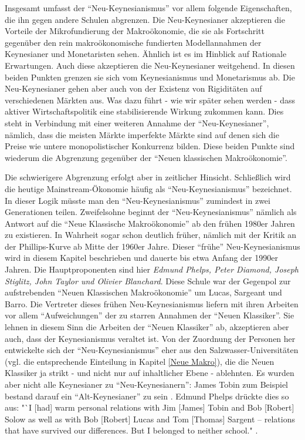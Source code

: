 Insgesamt umfasst der "`Neu-Keynesianismus"' vor allem folgende Eigenschaften, die ihn gegen andere Schulen abgrenzen. Die Neu-Keynesianer akzeptieren die Vorteile der Mikrofundierung der Makroökonomie, die sie als Fortschritt gegenüber den rein makroökonomische fundierten Modellannahmen der Keynesianer und Monetaristen sehen. Ähnlich ist es im Hinblick auf Rationale Erwartungen. Auch diese akzeptieren die Neu-Keynesianer weitgehend. In diesen beiden Punkten grenzen sie sich vom Keynesianismus und Monetarismus ab. Die Neu-Keynesianer gehen aber auch von der Existenz von Rigiditäten auf verschiedenen Märkten aus. Was dazu führt - wie wir später sehen werden - dass aktiver Wirtschaftspolitik eine stabilisierende Wirkung zukommen kann. Dies steht in Verbindung mit einer weiteren Annahme der "`Neu-Keynesianer"', nämlich, dass die meisten Märkte imperfekte Märkte sind auf denen sich die Preise wie untere monopolistischer Konkurrenz bilden. Diese beiden Punkte sind wiederum die Abgrenzung gegenüber der "`Neuen klassischen Makroökonomie"'. 

Die schwierigere Abgrenzung erfolgt aber in zeitlicher Hinsicht. Schließlich wird die heutige Mainstream-Ökonomie häufig als "`Neu-Keynesianismus"' bezeichnet. In dieser Logik müsste man den "`Neu-Keynesianismus"' zumindest in zwei Generationen teilen. Zweifelsohne beginnt der "`Neu-Keynesianismus"' nämlich als Antwort auf die "`Neue Klassische Makroökonomie"' ab den frühen 1980er Jahren zu existieren. In Wahrheit sogar schon deutlich früher, nämlich mit der Kritik an der Phillips-Kurve ab Mitte der 1960er Jahre. Dieser "`frühe"' Neu-Keynesianismus wird in diesem Kapitel beschrieben und dauerte bis etwa Anfang der 1990er Jahren. Die Hauptproponenten sind hier \textit{Edmund Phelps, Peter Diamond, Joseph Stiglitz, John Taylor und Olivier Blanchard}. Diese Schule war der Gegenpol zur aufstrebenden "`Neuen Klassischen Makroökonomie"' um Lucas, Sargeant und Barro. Die Vertreter dieses frühen Neu-Keynesianismus liefern mit ihren Arbeiten vor allem "`Aufweichungen"' der zu starren Annahmen der "`Neuen Klassiker"'. Sie lehnen in diesem Sinn die Arbeiten der "`Neuen Klassiker"' ab, akzeptieren aber auch, dass der Keynesianismus veraltet ist. Von der Zuordnung der Personen her entwickelte sich der "`Neu-Keynesianismus"' eher aus den Salzwasser-Universitäten (vgl. die entsprechende Einteilung in Kapitel \ref{Neue Makro}), die die Neuen Klassiker ja strikt - und nicht nur auf inhaltlicher Ebene - ablehnten. Es wurden aber nicht alle Keynesianer zu "`Neu-Keynesianern"': James Tobin zum Beispiel bestand darauf ein "`Alt-Keynesianer"' zu sein \parencite[S. 45ff]{Tobin1993}. Edmund Phelps drückte dies so aus: "`I [had] warm personal relations with Jim [James] Tobin and Bob [Robert] Solow as well as with Bob [Robert] Lucas and Tom [Thomas] Sargent – relations that have survived our differences. But I belonged to neither school." \parencite{Phelps2006}.

